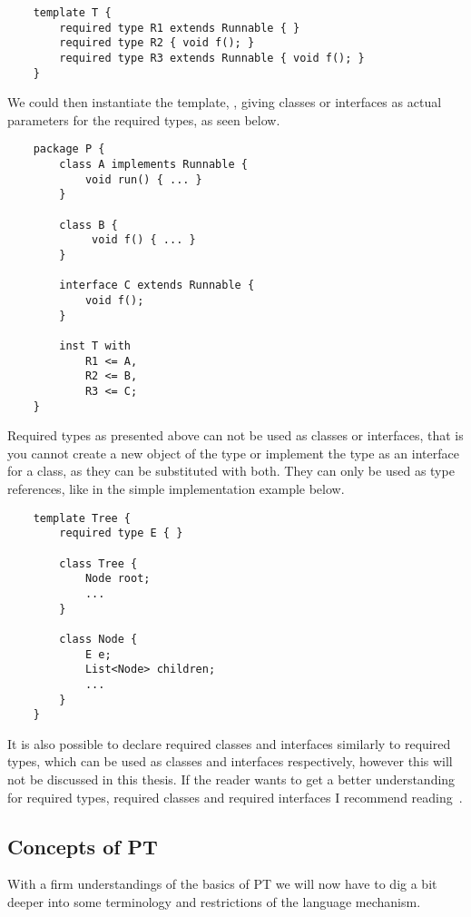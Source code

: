 \begin{verbatim}
    template T {
        required type R1 extends Runnable { }
        required type R2 { void f(); }
        required type R3 extends Runnable { void f(); }
    }
\end{verbatim}

We could then instantiate the template, , giving classes or interfaces as actual parameters for the required types, as seen below.

\begin{verbatim}
    package P {
        class A implements Runnable {
            void run() { ... }
        }

        class B {
             void f() { ... }
        }

        interface C extends Runnable {
            void f();
        }

        inst T with
            R1 <= A,
            R2 <= B,
            R3 <= C;
    }
\end{verbatim}

Required types as presented above can not be used as classes or interfaces, that is you cannot create a new object of the type or implement the type as an interface for a class, as they can be substituted with both.
They can only be used as type references, like in the simple  implementation example below.

\begin{verbatim}
    template Tree {
        required type E { }

        class Tree {
            Node root;
            ...
        }

        class Node {
            E e;
            List<Node> children;
            ...
        }
    }
\end{verbatim}

It is also possible to declare required classes and interfaces similarly to required types, which can be used as classes and interfaces respectively, however this will not be discussed in this thesis.
If the reader wants to get a better understanding for required types, required classes and required interfaces I recommend reading~\cite{requiredtypes}.

\subsection{Concepts of PT}\label{subsec:advanced-topics-of-pt}

With a firm understandings of the basics of PT we will now have to dig a bit deeper into some terminology and restrictions of the language mechanism.

